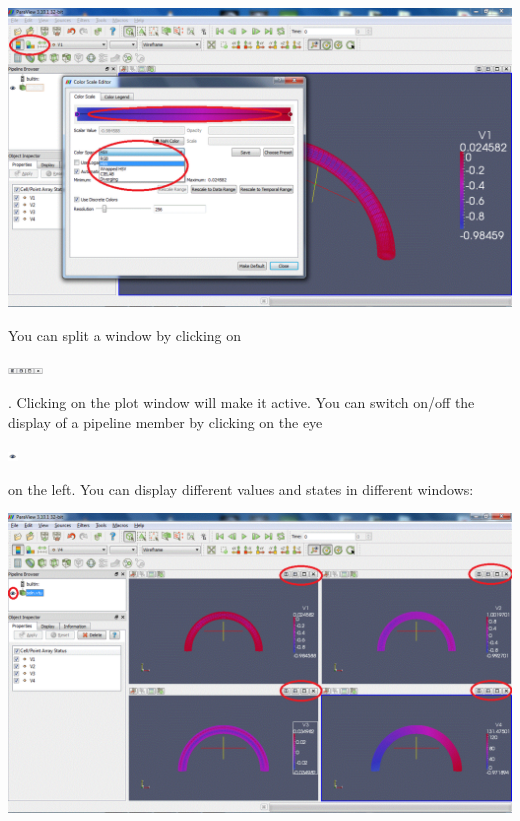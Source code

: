  
\begin{DoxyImageNoCaption}
  \mbox{\includegraphics[width=\textwidth]{paraview05}}
\end{DoxyImageNoCaption}


You can split a window by clicking on  
\begin{DoxyImageNoCaption}
  \mbox{\includegraphics[width=0.07\textwidth]{split_button}}
\end{DoxyImageNoCaption}
 . Clicking on the plot window will make it active. You can switch on/off the display of a pipeline member by clicking on the eye  
\begin{DoxyImageNoCaption}
  \mbox{\includegraphics[width=0.02\textwidth]{eye_button}}
\end{DoxyImageNoCaption}
 on the left. You can display different values and states in different windows\+:

 
\begin{DoxyImageNoCaption}
  \mbox{\includegraphics[width=\textwidth]{paraview051}}
\end{DoxyImageNoCaption}




